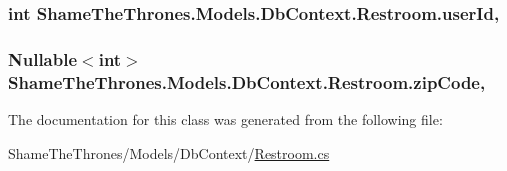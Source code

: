 \subsubsection[{\texorpdfstring{user\+Id}{userId}}]{\setlength{\rightskip}{0pt plus 5cm}int Shame\+The\+Thrones.\+Models.\+Db\+Context.\+Restroom.\+user\+Id\hspace{0.3cm}{\ttfamily [get]}, {\ttfamily [set]}}\hypertarget{class_shame_the_thrones_1_1_models_1_1_db_context_1_1_restroom_ab03e35cceefb91c5b547a6dbb3988080}{}\label{class_shame_the_thrones_1_1_models_1_1_db_context_1_1_restroom_ab03e35cceefb91c5b547a6dbb3988080}
\subsubsection[{\texorpdfstring{zip\+Code}{zipCode}}]{\setlength{\rightskip}{0pt plus 5cm}Nullable$<$int$>$ Shame\+The\+Thrones.\+Models.\+Db\+Context.\+Restroom.\+zip\+Code\hspace{0.3cm}{\ttfamily [get]}, {\ttfamily [set]}}\hypertarget{class_shame_the_thrones_1_1_models_1_1_db_context_1_1_restroom_abefbeef7ba0330ade218b2fcc31d3ec4}{}\label{class_shame_the_thrones_1_1_models_1_1_db_context_1_1_restroom_abefbeef7ba0330ade218b2fcc31d3ec4}


The documentation for this class was generated from the following file\+:\begin{DoxyCompactItemize}
\item 
Shame\+The\+Thrones/\+Models/\+Db\+Context/\hyperlink{_restroom_8cs}{Restroom.\+cs}\end{DoxyCompactItemize}
